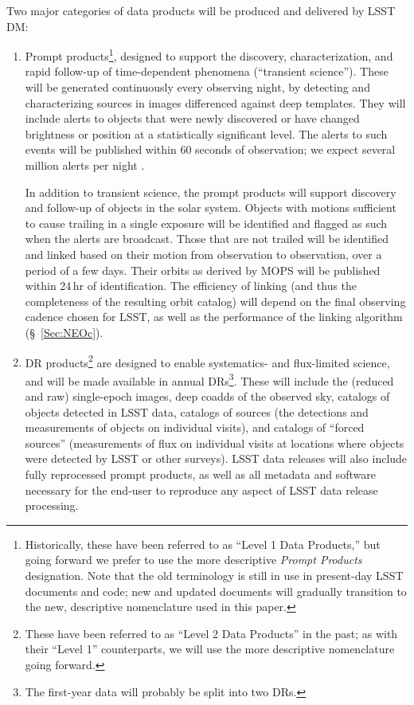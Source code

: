Two major categories of data products will be produced and delivered by LSST DM:
\begin{enumerate}
\item Prompt products\footnote{Historically, these have been referred to as ``Level
1 Data Products,'' but going forward we prefer to use the more descriptive
\emph{Prompt Products} designation. Note that the old terminology is still
in use in present-day LSST documents and code; new and updated
documents will gradually transition to the new, descriptive nomenclature
used in this paper.},
  designed to support the discovery,
  characterization, and rapid follow-up of time-dependent phenomena
  (``transient science''). These will be generated continuously every
  observing night, by detecting and characterizing sources in images
  differenced against deep templates. They will include alerts to
  objects that were newly discovered or have changed brightness or
  position at a statistically significant level. The alerts to such
  events will be published within 60 seconds of observation; we
  expect several million alerts per night \citep{RMMOH2014}.

In addition to transient science, the prompt products will support
discovery and follow-up of objects in the solar system. Objects with
motions sufficient to cause trailing in a single exposure will be
identified and flagged as such when the alerts are broadcast. Those
that are not trailed will be identified and linked based on their
motion from observation to observation, over a period of a few
days. Their orbits as derived by MOPS will be published within 24\,hr of
identification. The efficiency of linking (and thus the completeness
of the resulting orbit catalog) will depend on the final observing
cadence chosen for LSST, as well as the performance of the linking
algorithm (\S~\ref{Sec:NEOc}).

\item DR products\footnote{These have been referred to as ``Level
2 Data Products'' in the past; as with their ``Level 1'' counterparts, we
will use the more descriptive nomenclature going forward.} are
  designed to enable systematics- and flux-limited science, and will
  be made available in annual DRs\footnote{The first-year
    data will probably be split into two DRs.}. These will include the (reduced and raw) single-epoch images, deep coadds of the observed sky, catalogs of objects detected in LSST data, catalogs of sources (the detections and measurements of objects on individual visits), and catalogs of ``forced sources'' (measurements of flux on individual visits at locations where objects were detected by LSST or other surveys). LSST data releases will also include fully reprocessed prompt products, as well as all metadata and software necessary for the end-user to reproduce any aspect of LSST data release processing.


\end{enumerate}
